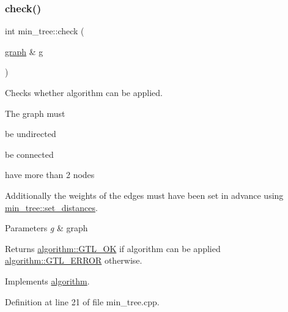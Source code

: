 \subsubsection{\texorpdfstring{check()}{check()}}
{\footnotesize\ttfamily int min\+\_\+tree\+::check (\begin{DoxyParamCaption}\item[{\mbox{\hyperlink{classgraph}{graph}} \&}]{g }\end{DoxyParamCaption})\hspace{0.3cm}{\ttfamily [virtual]}}



Checks whether algorithm can be applied. 

The graph must
\begin{DoxyItemize}
\item be undirected
\item be connected
\item have more than 2 nodes
\end{DoxyItemize}

Additionally the weights of the edges must have been set in advance using \mbox{\hyperlink{classmin__tree_a0f3eb1714b7859576037cf4b991b16cb}{min\+\_\+tree\+::set\+\_\+distances}}.


\begin{DoxyParams}{Parameters}
{\em g} & graph \\
\hline
\end{DoxyParams}
\begin{DoxyReturn}{Returns}
\mbox{\hyperlink{classalgorithm_af1a0078e153aa99c24f9bdf0d97f6710a5114c20e4a96a76b5de9f28bf15e282b}{algorithm\+::\+G\+T\+L\+\_\+\+OK}} if algorithm can be applied \mbox{\hyperlink{classalgorithm_af1a0078e153aa99c24f9bdf0d97f6710a6fcf574690bbd6cf710837a169510dd7}{algorithm\+::\+G\+T\+L\+\_\+\+E\+R\+R\+OR}} otherwise. 
\end{DoxyReturn}


Implements \mbox{\hyperlink{classalgorithm_a76361fb03ad1cf643affc51821e43bed}{algorithm}}.



Definition at line 21 of file min\+\_\+tree.\+cpp.


